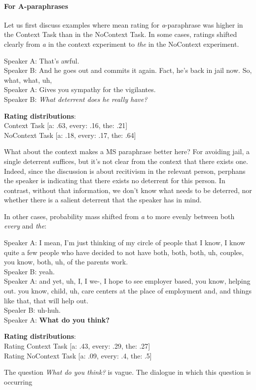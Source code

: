\documentclass[12pt,letterpaper,table,svgnames,dvipsnames]{article}
\begin{document}
\paragraph{For A-paraphrases} Let us first discuss examples where mean rating for \emph{a}-paraphrase was higher in the Context Task than in the NoContext Task. In some cases, ratings shifted clearly from \emph{a} in the context experiment to \emph{the} in the NoContext experiment.
\begin{exe}
\ex {}
\begin{xlist}
    \ex {}
    Speaker A: That's awful.\\
    Speaker B: And he goes out and commits it again. Fact, he's back in jail now. So, what, what, uh,\\
    Speaker A: Gives you sympathy for the vigilantes.\\
    Speaker B: \emph{What deterrent does he really have?}
    
    \ex \textbf{Rating distributions}:\\
    Context Task [a: .63, every: .16, the: .21]\\
    NoContext Task [a: .18, every: .17, the: .64]
    \end{xlist}
\end{exe}
What about the context makes a MS paraphrase better here? For avoiding jail, a single deterrent suffices, but it's not clear from the context that there exists one. Indeed, since the discussion is about recitivism in the relevant person, perphans the speaker is indicating that there exists no deterrent for this person. In contrast, without that information, we don't know what needs to be deterred, nor whether there is a salient deterrent that the speaker has in mind.

In other cases, probability mass shifted from \emph{a} to more evenly between both \emph{every} and \emph{the}:
\begin{exe}
    \ex {}
    \begin{xlist}
    \ex {}
    Speaker A: I mean, I'm just thinking of my circle of people that I know, I know quite a few people who have decided to not have both, both, both, uh, couples, you know, both, uh, of the parents work.\\
    Speaker B: yeah.\\
    Speaker A: and yet, uh, I, I we-, I hope to see employer based, you know, helping out. you know, child, uh, care centers at the place of employment and, and things like that, that will help out.\\
    Spealer B: uh-huh.\\
    Speaker A: \textbf{What do you think?}
    
    \ex \textbf{Rating distributions}:\\
    Rating Context Task [a: .43, every: .29, the: .27]\\
    Rating NoContext Task [a: .09, every: .4, the: .5]
    \end{xlist}
\end{exe}
The question \emph{What do you think?} is vague. The dialogue in which this question is occurring 
\end{document}
